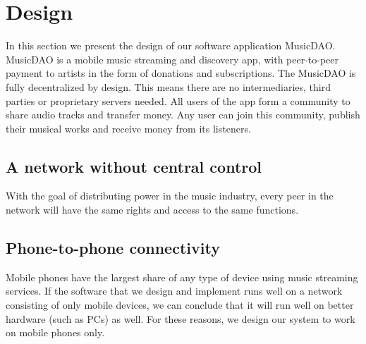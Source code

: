 \chapter{Design}
In this section we present the design of our software application MusicDAO. MusicDAO is a mobile music streaming and discovery app, with peer-to-peer payment to artists in the form of donations and subscriptions. The MusicDAO is fully decentralized by design. This means there are no intermediaries, third parties or proprietary servers needed. All users of the app form a community to share audio tracks and transfer money. Any user can join this community, publish their musical works and receive money from its listeners.

\section{A network without central control}
With the goal of distributing power in the music industry, every peer in the network will have the same rights and access to the same functions.

\section{Phone-to-phone connectivity}
Mobile phones have the largest share of any type of device using music streaming services. If the software that we design and implement runs well on a network consisting of only mobile devices, we can conclude that it will run well on better hardware (such as PCs) as well. For these reasons, we design our system to work on mobile phones only.

